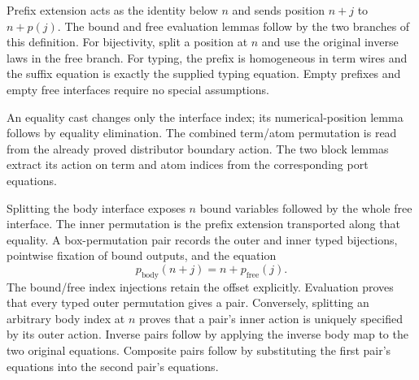 Prefix extension acts as the identity below $n$ and sends position $n+j$
to $n+p(j)$. The bound and free evaluation lemmas follow by the two branches of
this definition. For bijectivity, split a position at $n$ and use the original
inverse laws in the free branch. For typing, the prefix is homogeneous in term
wires and the suffix equation is exactly the supplied typing equation. Empty
prefixes and empty free interfaces require no special assumptions.





An equality cast changes only the interface index; its numerical-position
lemma follows by equality elimination. The combined term/atom permutation is
read from the already proved distributor boundary action. The two block lemmas
extract its action on term and atom indices from the corresponding port equations.






Splitting the body interface exposes $n$ bound variables followed by the
whole free interface. The inner permutation is the prefix extension transported
along that equality. A box-permutation pair records the outer and inner typed
bijections, pointwise fixation of bound outputs, and the equation
\[
 p_{\mathrm{body}}(n+j)=n+p_{\mathrm{free}}(j).
\]
The bound/free index injections retain the offset explicitly. Evaluation proves
that every typed outer permutation gives a pair. Conversely, splitting an
arbitrary body index at $n$ proves that a pair's inner action is uniquely
specified by its outer action. Inverse pairs follow by applying the inverse body
map to the two original equations. Composite pairs follow by substituting the
first pair's equations into the second pair's equations.

